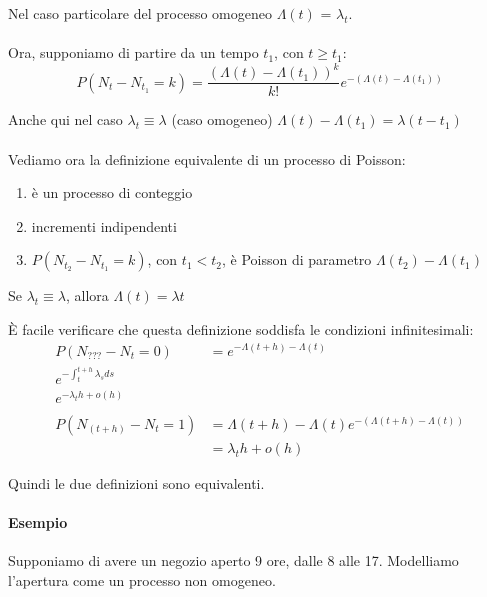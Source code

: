 \documentclass[a4paper,12pt]{book}
\begin{document}
Nel caso particolare del processo omogeneo $\Lambda(t)$ = $\lambda_t$.
\\
\\
Ora, supponiamo di partire da un tempo $ t_1 $, con $ t \ge t_1 $:
$$ P(N_t - N_{t_1} = k) = \frac{(\Lambda(t) - \Lambda(t_1))^k}{k!} e^{-(\Lambda(t) - \Lambda(t_1))} $$

Anche qui nel caso $\lambda_t \equiv \lambda$ (caso omogeneo) $ \Lambda(t) - \Lambda(t_1) = \lambda(t - t_1) $
\\
\\
Vediamo ora la definizione equivalente di un processo di Poisson:
\begin{enumerate}
	\item è un processo di conteggio
	\item incrementi indipendenti
	\item $ P(N_{t_2} - N_{t_1} = k) $, con $ t_1 < t_2 $, è Poisson di parametro $\Lambda(t_2) - \Lambda(t_1)$
\end{enumerate}
Se $\lambda_t \equiv \lambda$, allora $\Lambda(t) = \lambda t$ %

È facile verificare che questa definizione soddisfa le condizioni infinitesimali:
\begin{align*}
	P(N_{???} - N_t = 0) & = e^{-\Lambda(t+h) - \Lambda(t)} \\ %
	e^{-\int_{t}^{t+h} \lambda_s ds} \\
	e^{-\lambda_t h + o(h)} \\
	\\
	P(N_{(t+h)} - N_t = 1 ) & = \Lambda(t+h) - \Lambda(t) e^{-(\Lambda(t+h) - \Lambda(t))} \\
	& = \lambda_t h + o(h)
\end{align*}

Quindi le due definizioni sono equivalenti. 

\paragraph{Esempio} Supponiamo di avere un negozio aperto 9 ore, dalle 8 alle 17. Modelliamo l'apertura come un processo non omogeneo.
\end{document}

